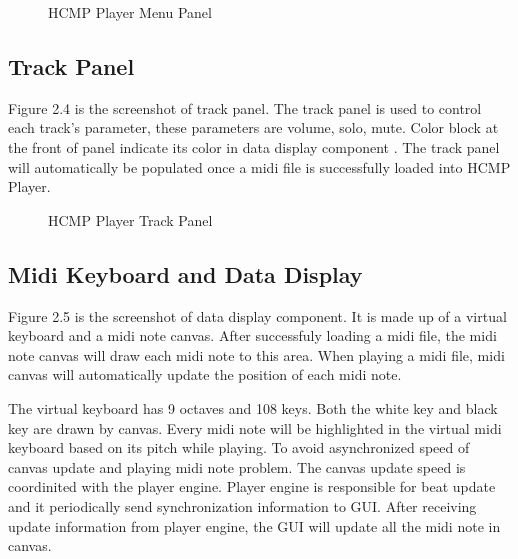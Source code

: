 \begin{figure}[H]
\caption{HCMP Player Menu Panel}
\label{fig:speciation}
\end{figure}

\subsection{Track Panel}

Figure 2.4 is the screenshot of track panel. The track panel is used to 
control each track's parameter, these parameters are volume, solo, mute. Color
block at the front of panel indicate its color in data display component . The 
track panel will automatically be populated once a midi file is successfully 
loaded into HCMP Player. 
\begin{figure}[H]
\caption{HCMP Player Track Panel}
\label{fig:speciation}
\end{figure}

\subsection{Midi Keyboard and Data Display}
Figure 2.5 is the screenshot of data display component. It is made up of a virtual  
keyboard and a midi note canvas. After successfuly loading a midi file, the midi 
note canvas will 
draw each midi note to this area. When playing a midi file, midi canvas will 
automatically update the position of each midi note. 

The virtual keyboard has 9 octaves and 108 keys. Both the white key and black key 
are drawn by canvas. Every midi note will be highlighted in the 
virtual midi keyboard based on its pitch while playing. To avoid asynchronized speed 
of canvas update and playing midi note problem. The canvas update speed is 
coordinited with the player engine. Player engine is responsible for beat update and it 
periodically send synchronization information to GUI. After receiving update 
information from player engine, the GUI will update all the midi note in canvas.

